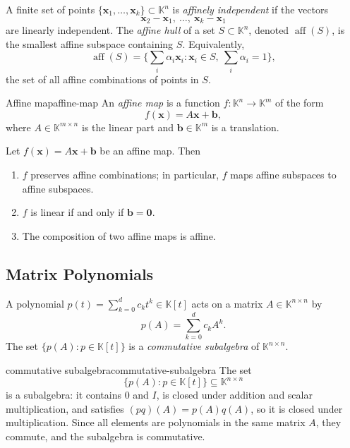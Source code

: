 A finite set of points $\{\mathbf{x}_1,\dots,\mathbf{x}_k\}\subset\mathbb{K}^n$ is \emph{affinely independent} if the vectors
\[
    \mathbf{x}_2-\mathbf{x}_1,\ \dots,\ \mathbf{x}_k-\mathbf{x}_1
\]
are linearly independent. The \emph{affine hull} of a set $S\subset\mathbb{K}^n$, denoted $\operatorname{aff}(S)$, is the smallest affine subspace containing $S$. Equivalently,
\[
    \operatorname{aff}(S)=\Big\{\sum_{i}\alpha_i\mathbf{x}_i : \mathbf{x}_i\in S,\ \sum_i\alpha_i=1\Big\},
\]
the set of all affine combinations of points in $S$.

\begin{definition}{Affine map}{affine-map}
    An \emph{affine map} is a function $f:\mathbb{K}^n\to\mathbb{K}^m$ of the form
    \[
        f(\mathbf{x}) = A\mathbf{x} + \mathbf{b},
    \]
    where $A\in\mathbb{K}^{m\times n}$ is the linear part and $\mathbf{b}\in\mathbb{K}^m$ is a translation.
\end{definition}

Let $f(\mathbf{x})=A\mathbf{x}+\mathbf{b}$ be an affine map. Then
\begin{enumerate}
    \item $f$ preserves affine combinations; in particular, $f$ maps affine subspaces to affine subspaces.
    \item $f$ is linear if and only if $\mathbf{b}=\mathbf{0}$.
    \item The composition of two affine maps is affine.
\end{enumerate}


\subsection{Matrix Polynomials}
\label{sec:polynomials}

A polynomial $p(t)=\sum_{k=0}^d c_k t^k\in\mathbb{K}[t]$ acts on a matrix $A\in\mathbb{K}^{n\times n}$ by
\[
    p(A)=\sum_{k=0}^d c_k A^k.
\]
The set $\{p(A):p\in\mathbb{K}[t]\}$ is a \emph{commutative subalgebra} of $\mathbb{K}^{n\times n}$.

\begin{remark}{commutative subalgebra}{commutative-subalgebra}
    The set
    \[
        \{p(A) : p \in \mathbb{K}[t]\} \subseteq \mathbb{K}^{n \times n}
    \]
    is a subalgebra: it contains $0$ and $I$, is closed under addition and scalar multiplication, and satisfies $(pq)(A) = p(A)q(A)$,
    so it is closed under multiplication.
    Since all elements are polynomials in the same matrix $A$, they commute, and the subalgebra is commutative.
\end{remark}



